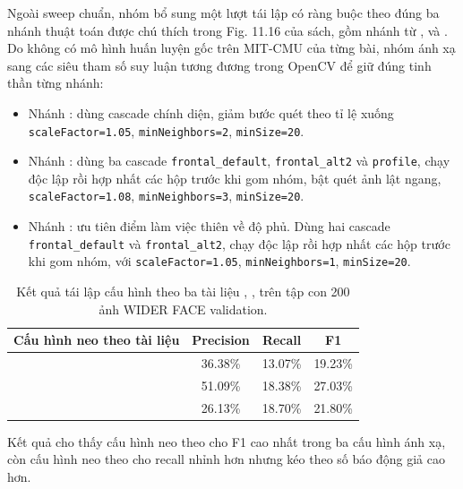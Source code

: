 Ngoài sweep chuẩn, nhóm bổ sung một lượt tái lập có ràng buộc theo đúng ba nhánh thuật toán được chú thích trong Fig. 11.16 của sách, gồm nhánh từ \cite{brubaker2008cascade_design}, \cite{li2004floatboost} và \cite{wu2008asymmetric}.
Do không có mô hình huấn luyện gốc trên MIT-CMU của từng bài, nhóm ánh xạ sang các siêu tham số suy luận tương đương trong OpenCV để giữ đúng tinh thần từng nhánh:
\begin{itemize}
  \item Nhánh \cite{brubaker2008cascade_design}: dùng cascade chính diện, giảm bước quét theo tỉ lệ xuống \texttt{scaleFactor=1.05}, \texttt{minNeighbors=2}, \texttt{minSize=20}.
  \item Nhánh \cite{li2004floatboost}: dùng ba cascade \texttt{frontal\_default}, \texttt{frontal\_alt2} và \texttt{profile}, chạy độc lập rồi hợp nhất các hộp trước khi gom nhóm, bật quét ảnh lật ngang, \texttt{scaleFactor=1.08}, \texttt{minNeighbors=3}, \texttt{minSize=20}.
  \item Nhánh \cite{wu2008asymmetric}: ưu tiên điểm làm việc thiên về độ phủ.
  Dùng hai cascade \texttt{frontal\_default} và \texttt{frontal\_alt2}, chạy độc lập rồi hợp nhất các hộp trước khi gom nhóm, với \texttt{scaleFactor=1.05}, \texttt{minNeighbors=1}, \texttt{minSize=20}.
\end{itemize}

\begin{table}[H]
\centering
\caption{Kết quả tái lập cấu hình theo ba tài liệu \cite{brubaker2008cascade_design}, \cite{li2004floatboost}, \cite{wu2008asymmetric} trên tập con 200 ảnh WIDER FACE validation.}
\label{tab:cite-6-17-47-reproduce}
\begin{tabular}{lccc}
\toprule
Cấu hình neo theo tài liệu & Precision & Recall & F1 \\
\midrule
\cite{brubaker2008cascade_design} & 36.38\% & 13.07\% & 19.23\% \\
\cite{li2004floatboost} & 51.09\% & 18.38\% & 27.03\% \\
\cite{wu2008asymmetric} & 26.13\% & 18.70\% & 21.80\% \\
\bottomrule
\end{tabular}
\end{table}

Kết quả cho thấy cấu hình neo theo \cite{li2004floatboost} cho F1 cao nhất trong ba cấu hình ánh xạ, còn cấu hình neo theo \cite{wu2008asymmetric} cho recall nhỉnh hơn nhưng kéo theo số báo động giả cao hơn.

